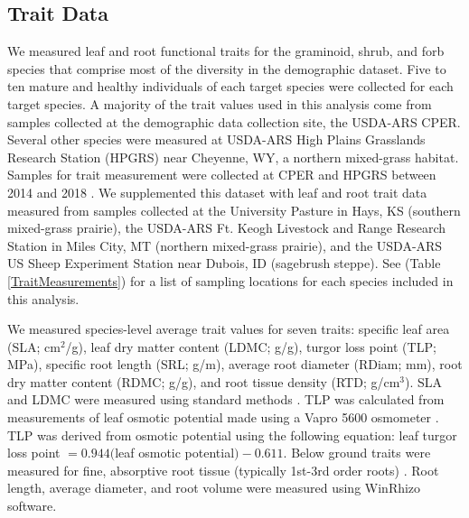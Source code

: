\documentclass[12pt, letterpaper]{article}
\begin{document}
\subsection{Trait Data} We measured leaf and root functional traits for the graminoid, shrub, and forb species that comprise most of the diversity in the demographic dataset. Five to ten mature and healthy individuals of each target species were collected for each target species. A majority of the trait values used in this analysis come from samples collected at the demographic data collection site, the USDA-ARS CPER. Several other species were measured at USDA-ARS High Plains Grasslands Research Station (HPGRS) near Cheyenne, WY, a northern mixed-grass habitat. Samples for trait measurement were collected at CPER and HPGRS between 2014 and 2018 \citep{Blumenthal2020}. We supplemented this dataset with leaf and root trait data measured from samples collected at the University Pasture in Hays, KS (southern mixed-grass prairie), the USDA-ARS Ft. Keogh Livestock and Range Research Station in Miles City, MT (northern mixed-grass prairie), and the USDA-ARS US Sheep Experiment Station near Dubois, ID (sagebrush steppe). See (Table \ref{TraitMeasurements}) for a list of sampling locations for each species included in this analysis. 

We measured species-level average trait values for seven traits: specific leaf area (SLA; cm$^2$/g), leaf dry matter content (LDMC; g/g), turgor loss point (TLP; MPa), specific root length (SRL; g/m), average root diameter (RDiam; mm), root dry matter content (RDMC; g/g), and root tissue density (RTD; g/cm$^3$). SLA and LDMC were measured using standard methods \citep{Perez-Harguindeguy2013}. TLP was calculated from measurements of leaf osmotic potential made using a Vapro 5600 osmometer \citep{Bartlett2012, Griffin-Nolan2019}. TLP was derived from osmotic potential using the following equation: leaf turgor loss point $= 0.944($leaf osmotic potential$) - 0.611$. Below ground traits were measured for fine, absorptive root tissue (typically 1st-3rd order roots) \citep{McCormack2015}. Root length, average diameter, and root volume were measured using WinRhizo software.
\end{document}

